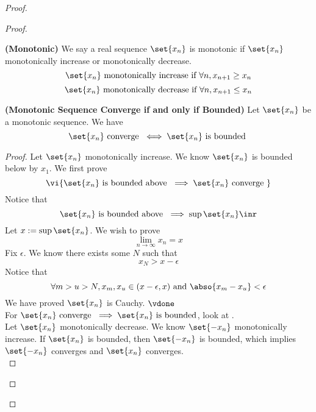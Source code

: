 \documentclass{report}
\begin{document}
\begin{proof}
\begin{proof}
\begin{definition}
\label{4.3.9}
\textbf{(Monotonic)} We say a real sequence $\set{x_n}$ is monotonic if $\set{x_n}$ monotonically increase or monotonically decrease.
\begin{equation*}
\set{x_n}\text{ monotonically increase if }\forall n, x_{n+1}\geq x_n
\end{equation*}
\begin{equation*}
\set{x_n}\text{ monotonically decrease if }\forall n, x_{n+1}\leq x_n
\end{equation*}
\end{definition}
\begin{theorem}
\label{4.3.10}
\textbf{(Monotonic Sequence Converge if and only if Bounded)} Let $\set{x_n}$ be a monotonic sequence. We have
\begin{equation*}
\set{x_n}\text{ converge }\iff \set{x_n}\text{ is bounded }
\end{equation*}
\end{theorem}
\begin{proof}
Let $\set{x_n}$ monotonically increase. We know $\set{x_n}$ is bounded below by $x_1$. We first prove
\begin{equation*}
  \vi{\set{x_n}\text{ is bounded above }\implies \set{x_n}\text{ converge }}
\end{equation*}
Notice that
\begin{equation*}
\set{x_n}\text{ is bounded above }\implies \sup \set{x_n}\inr
\end{equation*}
Let $x:=\sup \set{x_n}$. We wish to prove
\begin{equation*}
\lim_{n\to\infty}x_n=x
\end{equation*}
Fix $\epsilon $. We know there exists some $N$ such that
 \begin{equation*}
x_N>x-\epsilon 
\end{equation*}
Notice that
\begin{equation*}
\forall m>u>N, x_m,x_u\in (x-\epsilon ,x)\text{ and }\abso{x_m-x_u}<\epsilon 
\end{equation*}
We have proved $\set{x_n}$ is Cauchy. $\vdone$\\


For $\set{x_n}\text{ converge }\implies \set{x_n}\text{ is bounded}$, look at .\\

Let $\set{x_n}$ monotonically decrease. We know $\set{-x_n}$ monotonically increase. If $\set{x_n}$ is bounded, then $\set{-x_n}$ is bounded, which implies $\set{-x_n}$ converges and $\set{x_n}$ converges.\\


\end{proof}
\end{proof}
\end{proof}
\end{document}
